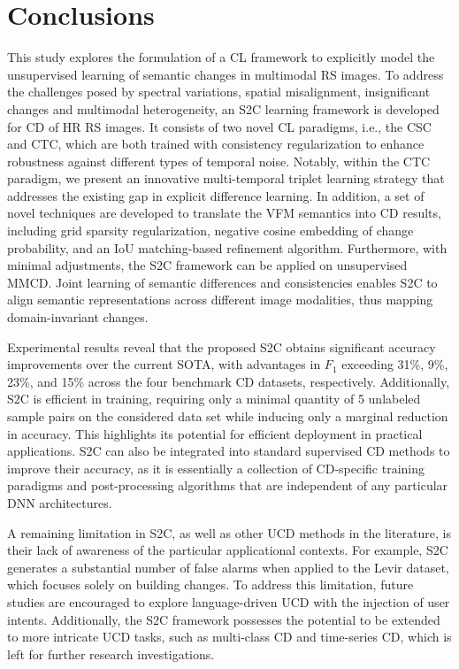 \section{Conclusions}\label{sc5}

This study explores the formulation of a CL framework to explicitly model the unsupervised learning of semantic changes in multimodal RS images. To address the challenges posed by spectral variations, spatial misalignment, insignificant changes and multimodal heterogeneity, an S2C learning framework is developed for CD of HR RS images.
It consists of two novel CL paradigms, i.e., the CSC and CTC, which are both trained with consistency regularization to enhance robustness against different types of temporal noise. Notably, within the CTC paradigm, we present an innovative multi-temporal triplet learning strategy that addresses the existing gap in explicit difference learning. In addition, a set of novel techniques are developed to translate the VFM semantics into CD results, including grid sparsity regularization, negative cosine embedding of change probability, and an IoU matching-based refinement algorithm. Furthermore, with minimal adjustments, the S2C framework can be applied on unsupervised MMCD. Joint learning of semantic differences and consistencies enables S2C to align semantic representations across different image modalities, thus mapping domain-invariant changes. 

Experimental results reveal that the proposed S2C obtains significant accuracy improvements over the current SOTA, with advantages in $F_1$ exceeding 31\%, 9\%, 23\%, and 15\% across the four benchmark CD datasets, respectively. Additionally, S2C is efficient in training, requiring only a minimal quantity of 5 unlabeled sample pairs on the considered data set while inducing only a marginal reduction in accuracy. This highlights its potential for efficient deployment in practical applications. S2C can also be integrated into standard supervised CD methods to improve their accuracy, as it is essentially a collection of CD-specific training paradigms and post-processing algorithms that are independent of any particular DNN architectures.

A remaining limitation in S2C, as well as other UCD methods in the literature, is their lack of awareness of the particular applicational contexts. For example, S2C generates a substantial number of false alarms when applied to the Levir dataset, which focuses solely on building changes. To address this limitation, future studies are encouraged to explore language-driven UCD with the injection of user intents. Additionally, the S2C framework possesses the potential to be extended to more intricate UCD tasks, such as multi-class CD and time-series CD, which is left for further research investigations.